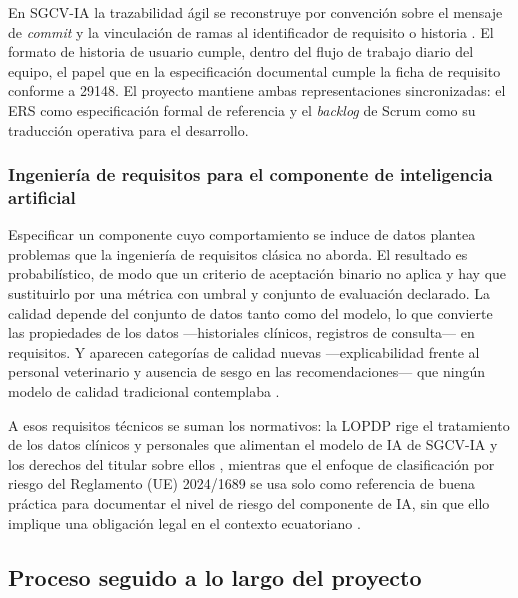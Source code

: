 En SGCV-IA la trazabilidad ágil se reconstruye por convención sobre el mensaje de \emph{commit} y la
vinculación de ramas al identificador de requisito o historia \cite{clelandhuang2012}. El formato de
historia de usuario \cite{cohn2004} cumple, dentro del flujo de trabajo diario del equipo, el papel
que en la especificación documental cumple la ficha de requisito conforme a 29148. El proyecto
mantiene ambas representaciones sincronizadas: el ERS como especificación formal de referencia y el
\emph{backlog} de Scrum como su traducción operativa para el desarrollo.
 
\subsubsection*{Ingeniería de requisitos para el componente de inteligencia artificial}
 
Especificar un componente cuyo comportamiento se induce de datos plantea problemas que la ingeniería
de requisitos clásica no aborda. El resultado es probabilístico, de modo que un criterio de
aceptación binario no aplica y hay que sustituirlo por una métrica con umbral y conjunto de
evaluación declarado. La calidad depende del conjunto de datos tanto como del modelo, lo que convierte
las propiedades de los datos ---historiales clínicos, registros de consulta--- en requisitos. Y
aparecen categorías de calidad nuevas ---explicabilidad frente al personal veterinario y ausencia de
sesgo en las recomendaciones--- que ningún modelo de calidad tradicional contemplaba
\cite{vogelsang2024, chazette2021}.
 
A esos requisitos técnicos se suman los normativos: la LOPDP rige el tratamiento de los datos
clínicos y personales que alimentan el modelo de IA de SGCV-IA y los derechos del titular sobre ellos
\cite{lopdp2021}, mientras que el enfoque de clasificación por riesgo del Reglamento (UE) 2024/1689
se usa solo como referencia de buena práctica para documentar el nivel de riesgo del componente de
IA, sin que ello implique una obligación legal en el contexto ecuatoriano \cite{aiact2024}.
 
\subsection{Proceso seguido a lo largo del proyecto}
 
